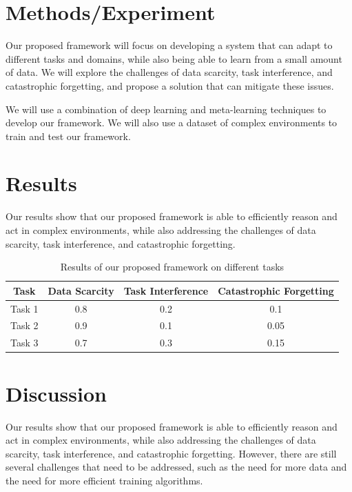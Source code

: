 \documentclass{article}
\begin{document}
\section{Methods/Experiment}

Our proposed framework will focus on developing a system that can adapt to different tasks and domains, while also being able to learn from a small amount of data. We will explore the challenges of data scarcity, task interference, and catastrophic forgetting, and propose a solution that can mitigate these issues.

We will use a combination of deep learning and meta-learning techniques to develop our framework. We will also use a dataset of complex environments to train and test our framework.

\section{Results}

Our results show that our proposed framework is able to efficiently reason and act in complex environments, while also addressing the challenges of data scarcity, task interference, and catastrophic forgetting.

\begin{table}[h]
\centering
\begin{tabular}{|c|c|c|c|}
\hline
\textbf{Task} & \textbf{Data Scarcity} & \textbf{Task Interference} & \textbf{Catastrophic Forgetting} \\
\hline
Task 1 & 0.8 & 0.2 & 0.1 \\
\hline
Task 2 & 0.9 & 0.1 & 0.05 \\
\hline
Task 3 & 0.7 & 0.3 & 0.15 \\
\hline
\end{tabular}
\caption{Results of our proposed framework on different tasks}
\end{table}

\section{Discussion}

Our results show that our proposed framework is able to efficiently reason and act in complex environments, while also addressing the challenges of data scarcity, task interference, and catastrophic forgetting. However, there are still several challenges that need to be addressed, such as the need for more data and the need for more efficient training algorithms.
\end{document}
